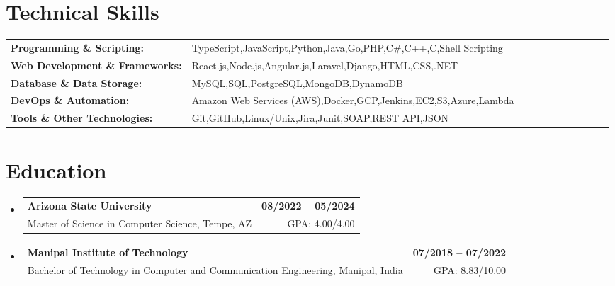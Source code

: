 \documentclass[letterpaper,11pt]{article}
\makeatletter
\newcommand{\educationSubheading}[4]{
  \vspace{-2pt}\item
    \begin{tabular*}{1.0\textwidth}[t]{l@{\extracolsep{\fill}}r}
      \textbf{\small #1} & \textbf{\small #2} \\
      {\small#3} & {\small #4} \\
    \end{tabular*}\vspace{-7pt}
}
\newcommand{\resumeSubHeadingListStart}{\begin{itemize}[leftmargin=0pt, label={}]}
\newcommand{\resumeSubHeadingListEnd}{\end{itemize}}
\makeatother
\begin{document}
\section{Technical Skills}
        \vspace{-14pt}
        \begin{table}[h]
            \footnotesize
            \begin{tabular}{p{0.3\linewidth} p{0.7\linewidth}}
                \textbf{Programming \& Scripting:} & TypeScript,JavaScript,Python,Java,Go,PHP,C\#,C++,C,Shell Scripting \\
                \textbf{Web Development \& Frameworks:} & React.js,Node.js,Angular.js,Laravel,Django,HTML,CSS,.NET \\
                \textbf{Database \& Data Storage:} & MySQL,SQL,PostgreSQL,MongoDB,DynamoDB \\
                \textbf{DevOps \& Automation:} & Amazon Web Services (AWS),Docker,GCP,Jenkins,EC2,S3,Azure,Lambda \\
                \textbf{Tools \& Other Technologies:} & Git,GitHub,Linux/Unix,Jira,Junit,SOAP,REST API,JSON \\
            \end{tabular}
        \end{table}

 \vspace{-15pt}

\section{Education}
  \resumeSubHeadingListStart
    \educationSubheading
      {Arizona State University}{08/2022 -- 05/2024}
      {Master of Science in Computer Science, Tempe, AZ}{GPA: 4.00/4.00}

    \educationSubheading
      {Manipal Institute of Technology}{07/2018 -- 07/2022}
      {Bachelor of Technology in Computer and Communication Engineering, Manipal, India}{GPA: 8.83/10.00}
  \resumeSubHeadingListEnd
\end{document}
